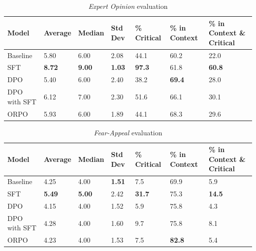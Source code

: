 \documentclass[11pt]{article}
\begin{document}
\begin{table}[H]
    \centering
    \begin{tabular}{lllllll}
        \hline
        \textbf{Model} & \textbf{Average} & \textbf{Median} & \textbf{Std Dev} & \textbf{\% Critical} &  \textbf{\% in Context} & \textbf{\% in Context \& Critical} \\
        \hline
Baseline&	5.80&	6.00&	2.08	&44.1&	60.2&	22.0\\
SFT&	\textbf{8.72}&	\textbf{9.00}&	\textbf{1.03}&	\textbf{97.3}&	61.8&	\textbf{60.8}\\
DPO&	5.40&	6.00&	2.40&	38.2&	\textbf{69.4}&	28.0\\
DPO with SFT &	6.12&	7.00	&2.30	&51.6&	66.1&	30.1 \\
ORPO & 5.93 & 6.00 & 1.89 & 44.1 & 68.3 & 29.6 \\
        \hline
    \end{tabular}
    \caption{\textit{Expert Opinion} evaluation}
    \label{tab: expert opinion}
\end{table}

\begin{table}[H]
    \centering
    \begin{tabular}{lllllll}
        \hline
        \textbf{Model} & \textbf{Average} & \textbf{Median} & \textbf{Std Dev} & \textbf{\% Critical} &  \textbf{\% in Context} & \textbf{\% in Context \& Critical} \\
        \hline
Baseline&	4.25&	4.00	&\textbf{1.51}&	7.5&	69.9&	5.9\\
SFT	&\textbf{5.49}	&\textbf{5.00}&	2.42	&\textbf{31.7} &	75.3&	\textbf{14.5}\\
DPO	&4.15	&4.00&	1.52	&5.9&	75.8&	4.3\\
DPO with SFT	&4.28&	4.00	&1.60	&9.7&	75.8&	8.1 \\
ORPO & 4.23 & 4.00 & 1.53 & 7.5 & \textbf{82.8} & 5.4 \\
        \hline
    \end{tabular}
    \caption{\textit{Fear-Appeal} evaluation}
    \label{tab: fear appeal}
\end{table}
\end{document}
